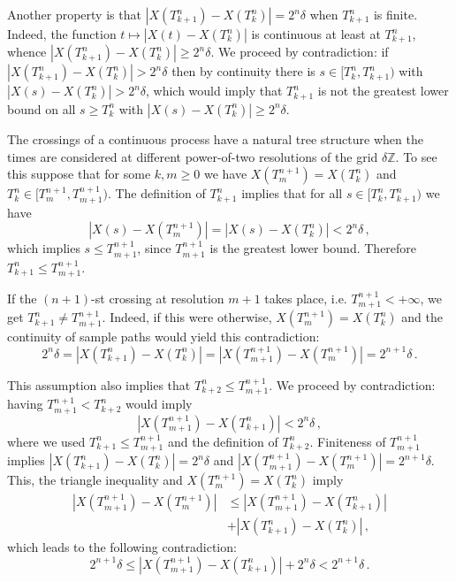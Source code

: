 \documentclass[a4paper]{article}
\begin{document}
Another property is that $|X(T_{k+1}^n) - X(T_k^n)| = 2^n\delta$ when $T_{k+1}^n$
is finite. Indeed, the function $t \mapsto |X(t) - X(T_k^n)|$ is continuous at least
at $T_{k+1}^n$, whence $|X(T_{k+1}^n) - X(T_k^n)| \geq 2^n\delta$. We proceed by
contradiction: if $|X(T_{k+1}^n) - X(T_k^n)| > 2^n\delta$ then by continuity there
is $s\in [T_k^n, T_{k+1}^n)$ with $|X(s) - X(T_k^n)| > 2^n\delta$, which would
imply that $T_{k+1}^n$ is not the greatest lower bound on all $s\geq T_k^n$ with
$|X(s)-X(T_k^n)| \geq 2^n\delta$.


The crossings of a continuous process have a natural tree structure when the times
are considered at different power-of-two resolutions of the grid $\delta \mathbb{Z}$.
To see this suppose that for some $k, m\geq 0$ we have $X(T_m^{n+1}) = X(T_k^n)$
and $T_k^n \in [T_m^{n+1}, T_{m+1}^{n+1})$. The definition of $T_{k+1}^n$ implies
that for all $s \in [T_k^n, T_{k+1}^n)$ we have
\begin{equation}\label{eq:xing_resol}
    |X(s) - X(T_m^{n+1})| = |X(s) - X(T_k^n)| < 2^n\delta \,,
\end{equation}
which implies $s \leq T_{m+1}^{n+1}$, since $T_{m+1}^{n+1}$ is the greatest lower bound.
Therefore $T_{k+1}^n\leq T_{m+1}^{n+1}$.

If the $(n+1)$-st crossing at resolution $m+1$ takes place, i.e. $T_{m+1}^{n+1} < +\infty$,
we get $T_{k+1}^n \neq T_{m+1}^{n+1}$. Indeed, if this were otherwise, $X(T_m^{n+1}) = X(T_k^n)$
and the continuity of sample paths would yield this contradiction:
\begin{equation*} \label{eq:contrad_1}
    2^n\delta = |X(T_{k+1}^n) - X(T_k^n)|
    = |X(T_{m+1}^{n+1}) - X(T_m^{n+1})| = 2^{n+1} \delta\,.
\end{equation*}

This assumption also implies that $T_{k+2}^n \leq T_{m+1}^{n+1}$. We proceed by
contradiction: having $T_{m+1}^{n+1} < T_{k+2}^n$ would imply
\begin{equation*} \label{eq:contrad_2}
    |X(T_{m+1}^{n+1}) - X(T_{k+1}^n)| < 2^n\delta \,,
\end{equation*}
where we used $T_{k+1}^n \leq T_{m+1}^{n+1}$ and the definition of $T_{k+2}^n$.
Finiteness of $T_{m+1}^{n+1}$ implies $|X(T_{k+1}^n) - X(T_k^n)| = 2^n \delta$
and $|X(T_{m+1}^{n+1}) - X(T_m^{n+1})| = 2^{n+1} \delta$. This, the triangle inequality
and $X(T_m^{n+1}) = X(T_k^n)$ imply
\begin{align*} \label{eq:xing_triang}
  |X(T_{m+1}^{n+1}) - X(T_m^{n+1})|
  &\leq |X(T_{m+1}^{n+1}) - X(T_{k+1}^n)| \\
    & + |X(T_{k+1}^n) - X(T_k^n)| \,,
\end{align*}
which leads to the following contradiction:
\begin{equation*} \label{eq:contrad_3}
  2^{n+1} \delta
    \leq |X(T_{m+1}^{n+1}) - X(T_{k+1}^n)| + 2^n\delta
    < 2^{n+1} \delta \,.
\end{equation*}
\end{document}
